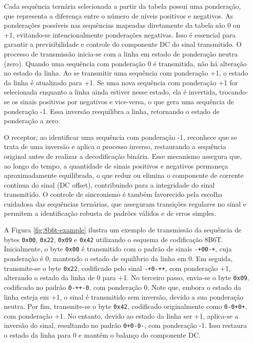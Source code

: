 \documentclass[conference]{IEEEtran}
\begin{document}
Cada sequência ternária selecionada a partir da tabela possui uma ponderação, que representa a diferença entre o número de níveis positivos e negativos. As ponderações possíveis nas sequências mapeadas diretamente da tabela são 0 ou +1, evitando-se intencionalmente ponderações negativas. Isso é essencial para garantir a previsibilidade e controle do componente DC do sinal transmitido. O processo de transmissão inicia-se com a linha em estado de ponderação neutra (zero). Quando uma sequência com ponderação 0 é transmitida, não há alteração no estado da linha. Ao se transmitir uma sequência com ponderação +1, o estado da linha é atualizado para +1. Se uma nova sequência com ponderação +1 for selecionada enquanto a linha ainda estiver nesse estado, ela é invertida, trocando-se os sinais positivos por negativos e vice-versa, o que gera uma sequência de ponderação -1. Essa inversão reequilibra a linha, retornando o estado de ponderação a zero.

O receptor, ao identificar uma sequência com ponderação -1, reconhece que se trata de uma inversão e aplica o processo inverso, restaurando a sequência original antes de realizar a decodificação binária. Esse mecanismo assegura que, ao longo do tempo, a quantidade de sinais positivos e negativos permaneça aproximadamente equilibrada, o que reduz ou elimina o componente de corrente contínua do sinal (DC offset), contribuindo para a integridade do sinal transmitido. O controle de sincronismo é também favorecido pela escolha cuidadosa das sequências ternárias, que asseguram transições regulares no sinal e permitem a identificação robusta de padrões válidos e de erros simples.

A Figura \ref{fig:8b6t-example} ilustra um exemplo de transmissão da sequência de bytes \texttt{0x00}, \texttt{0x22}, \texttt{0x09} e \texttt{0x42} utilizando o esquema de codificação 8B6T. Inicialmente, o byte \texttt{0x00} é transmitido com o padrão de sinais \texttt{-+00-+}, cuja ponderação é 0, mantendo o estado de equilíbrio da linha em 0. Em seguida, transmite-se o byte \texttt{0x22}, codificado pelo sinal \texttt{-+0-++}, com ponderação +1, alterando o estado da linha de 0 para +1. No terceiro passo, envia-se o byte \texttt{0x09}, codificado no padrão \texttt{0-++-0}, com ponderação 0. Note que, embora o estado da linha esteja em +1, o sinal é transmitido sem inversão, devido a sua ponderação neutra. Por fim, transmite-se o byte \texttt{0x42}, codificado originalmente como \texttt{0-0+0+}, com ponderação +1. No entanto, devido ao estado da linha ser +1, aplica-se a inversão do sinal, resultando no padrão \texttt{0+0-0-}, com ponderação -1. Isso restaura o estado da linha para 0 e mantém o balanço do componente DC.   
\end{document}
